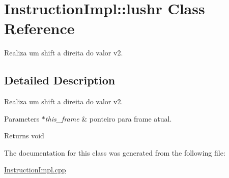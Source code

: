 \hypertarget{class_instruction_impl_1_1lushr}{}\section{Instruction\+Impl\+:\+:lushr Class Reference}
\label{class_instruction_impl_1_1lushr}


Realiza um shift a direita do valor v2.  




\subsection{Detailed Description}
Realiza um shift a direita do valor v2. 


\begin{DoxyParams}{Parameters}
{\em $\ast$this\+\_\+frame} & ponteiro para frame atual. \\
\hline
\end{DoxyParams}
\begin{DoxyReturn}{Returns}
void 
\end{DoxyReturn}


The documentation for this class was generated from the following file\+:\begin{DoxyCompactItemize}
\item 
\hyperlink{_instruction_impl_8cpp}{Instruction\+Impl.\+cpp}\end{DoxyCompactItemize}

